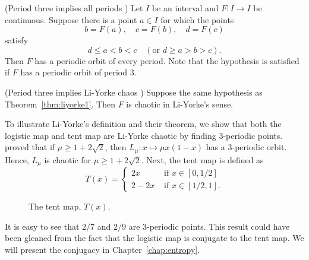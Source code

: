 \documentclass[10pt,draft,twoside]{book}
\begin{document}
\begin{theorem}
  (Period three implies all periods \citep{li-yorke})
  Let $I$ be an interval and $F: I\to I$ be continuous. Suppose there is a point $a \in I$ for which
  the points
  \begin{equation*}
  b = F(a), \quad c = F(b), \quad d = F(c)
  \end{equation*}
  satisfy
  \begin{equation*}
    d \leq a < b < c \quad(\mbox{or } d \geq a > b > c).
  \end{equation*}
  Then $F$ has a periodic orbit of every period.
  Note that the hypothesis is satisfied if $F$ has a periodic orbit of period 3.
  \label{thm:liyorke1}
\end{theorem}
\begin{theorem}
  (Period three implies Li-Yorke chaos \citep{li-yorke})
  Suppose the same hypothesis as Theorem~\ref{thm:liyorke1}.
  Then $F$ is chaotic in Li-Yorke's sense.
  \label{thm:liyorke2}
\end{theorem}
\begin{example}
  To illustrate Li-Yorke's definition and their theorem, we show that both the logistic map and tent map are Li-Yorke chaotic by finding 3-periodic points.
  \citet{saha} proved that if $\mu \geq 1 + 2\sqrt{2}$, then $L_\mu: x \mapsto \mu x(1-x)$ has a 3-periodic orbit.
  Hence, $L_\mu$ is chaotic for $\mu \geq 1 + 2\sqrt{2}$.
  Next, the tent map is defined as
  \begin{equation*}
    T(x) = 
    \begin{cases}
      2x     &\mbox{ if } x \in [0,1/2] \\
      2 - 2x &\mbox{ if } x \in [1/2,1].
    \end{cases}
  \end{equation*}

\begin{figure}[th]
  \centering
  \caption{The tent map, $T(x)$.}
\end{figure}

  It is easy to see that $2/7$ and $2/9$ are 3-periodic points.
  This result could have been gleaned from the fact that the logistic map is conjugate to the tent map.
  We will present the conjugacy in Chapter~\ref{chap:entropy}.
\end{example}
\end{document}

